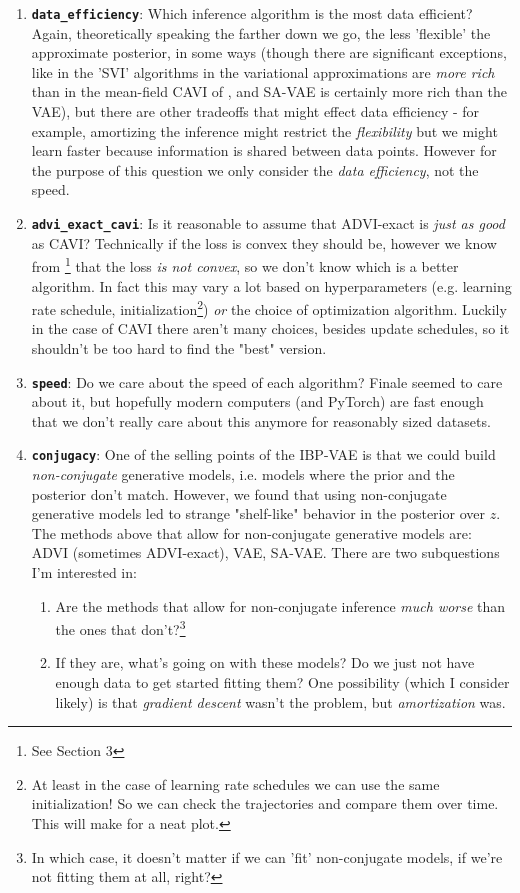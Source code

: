 \documentclass[a4paper, 11pt]{article}
\begin{document}
\begin{enumerate}
    \item \textbf{\texttt{data\_efficiency}}: Which inference algorithm is the most data efficient? Again, theoretically speaking the farther down we go, the less 'flexible' the approximate posterior, in some ways (though there are significant exceptions, like in the 'SVI' algorithms in \citet{shah2015empirical} the variational approximations are \emph{more rich} than in the mean-field CAVI of \citet{doshi2009variational}, and SA-VAE is certainly more rich than the VAE), but there are other tradeoffs that might effect data efficiency - for example, amortizing the inference might restrict the \emph{flexibility} but we might learn faster because information is shared between data points. However for the purpose of this question we only consider the \emph{data efficiency}, not the speed.
    \item \textbf{\texttt{advi\_exact\_cavi}}: Is it reasonable to assume that ADVI-exact is \emph{just as good} as CAVI? Technically if the loss is convex they should be, however we know from \citet{doshi2009report}\footnote{See Section 3} that the loss \emph{is not convex}, so we don't know which is a better algorithm. In fact this may vary a lot based on hyperparameters (e.g. learning rate schedule, initialization\footnote{At least in the case of learning rate schedules we can use the same initialization! So we can check the trajectories and compare them over time. This will make for a neat plot.}) \emph{or} the choice of optimization algorithm. Luckily in the case of CAVI there aren't many choices, besides update schedules, so it shouldn't be too hard to find the "best" version.
    \item \textbf{\texttt{speed}}: Do we care about the speed of each algorithm? Finale seemed to care about it, but hopefully modern computers (and PyTorch) are fast enough that we don't really care about this anymore for reasonably sized datasets.
    \item \textbf{\texttt{conjugacy}}: One of the selling points of the IBP-VAE is that we could build \emph{non-conjugate} generative models, i.e. models where the prior and the posterior don't match. However, we found that using non-conjugate generative models led to strange "shelf-like" behavior in the posterior over $z$. The methods above that allow for non-conjugate generative models are: ADVI (sometimes ADVI-exact), VAE, SA-VAE. There are two subquestions I'm interested in:
    \begin{enumerate}
        \item Are the methods that allow for non-conjugate inference \emph{much worse} than the ones that don't?\footnote{In which case, it doesn't matter if we can 'fit' non-conjugate models, if we're not fitting them at all, right?}
        \item If they are, what's going on with these models? Do we just not have enough data to get started fitting them? One possibility (which I consider likely) is that \emph{gradient descent} wasn't the problem, but \emph{amortization} was.
    \end{enumerate}
\end{enumerate}

\printbibliography
\end{document}
